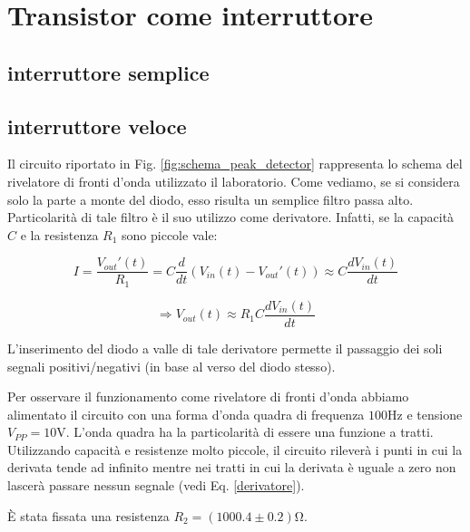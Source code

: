 

\section{Transistor come interruttore}
\subsection{interruttore semplice}
\subsection{interruttore veloce}
Il circuito riportato in Fig. \ref{fig:schema_peak_detector} rappresenta lo schema del rivelatore di fronti d'onda utilizzato il laboratorio. Come vediamo, se si considera solo la parte a monte del diodo, esso risulta un semplice filtro passa alto. Particolarità di tale filtro è il suo utilizzo come derivatore. Infatti, se la capacità $C$ e la resistenza $R_1$ sono piccole vale:

$$ I=\frac{V_{out}'(t)}{R_1}=C\frac{d}{dt}(V_{in}(t)-V_{out}'(t)) \approx C \frac{dV_{in}(t)}{dt} $$

\begin{equation} 
\Rightarrow V_{out}(t) \approx R_1C \frac{dV_{in}(t)}{dt} 
\label{derivatore}
\end{equation}

L'inserimento del diodo a valle di tale derivatore permette il passaggio dei soli segnali positivi/negativi (in base al verso del diodo stesso).

Per osservare il funzionamento come rivelatore di fronti d'onda abbiamo alimentato il circuito con una forma d'onda quadra di frequenza $100 \si{\hertz}$ e tensione $V_{PP}=10 \si{\volt}$. L'onda quadra ha la particolarità di essere una funzione a tratti. Utilizzando capacità e resistenze molto piccole, il circuito rileverà i punti in cui la derivata tende ad infinito mentre nei tratti in cui la derivata è uguale a zero non lascerà passare nessun segnale (vedi Eq. \ref{derivatore}).

È stata fissata una resistenza $R_2=(1000.4 \pm 0.2) \si{\ohm}$. 

